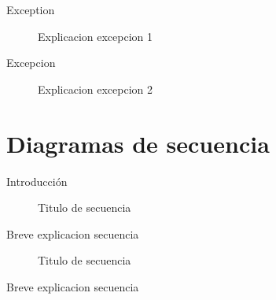 \documentclass[titlepage,a4paper]{article}
\begin{document}
\begin{description}
\item[Exception] Explicacion excepcion 1
\item[Excepcion] Explicacion excepcion 2
\end{description}

\section{Diagramas de secuencia}\label{sec:diagramasdesecuencia}

Introducción

\begin{figure}[H]
\centering
\caption{\label{fig:seq01}Titulo de secuencia}
\end{figure}

Breve explicacion secuencia 

\begin{figure}[H]
\centering
\caption{\label{fig:seq02}Titulo de secuencia}
\end{figure}

Breve explicacion secuencia
\end{document}
